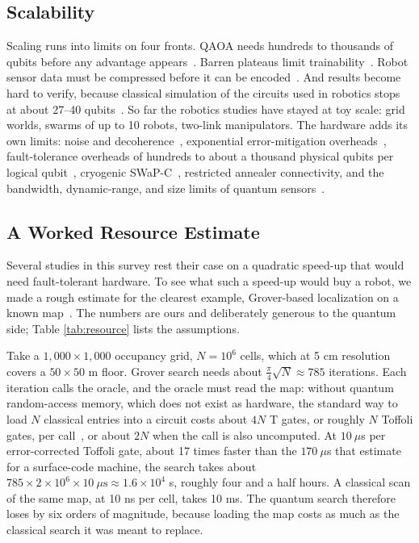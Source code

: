 \documentclass[acmsmall,screen,review]{acmart}
\begin{document}
\subsection{Scalability}\label{sec:scalability}
Scaling runs into limits on four fronts. QAOA needs hundreds to thousands of qubits before any advantage appears~\cite{Guerreschi2019}. Barren plateaus limit trainability~\cite{McClean2018,Larocca2025}. Robot sensor data must be compressed before it can be encoded~\cite{Chen2022}. And results become hard to verify, because classical simulation of the circuits used in robotics stops at about 27--40 qubits~\cite{Chella2022,Antero2025}. So far the robotics studies have stayed at toy scale: grid worlds, swarms of up to 10 robots, two-link manipulators. The hardware adds its own limits: noise and decoherence~\cite{Preskill2018}, exponential error-mitigation overheads~\cite{Cai2023}, fault-tolerance overheads of hundreds to about a thousand physical qubits per logical qubit~\cite{Fowler2012,Bravyi2024}, cryogenic SWaP-C~\cite{Kjaergaard2020}, restricted annealer connectivity, and the bandwidth, dynamic-range, and size limits of quantum sensors~\cite{Bongs2019,Wang2021}.


\subsection{A Worked Resource Estimate}\label{sec:resource}
Several studies in this survey rest their case on a quadratic speed-up that would need fault-tolerant hardware. To see what such a speed-up would buy a robot, we made a rough estimate for the clearest example, Grover-based localization on a known map~\cite{Antero2025}. The numbers are ours and deliberately generous to the quantum side; Table \ref{tab:resource} lists the assumptions.

Take a $1{,}000\times 1{,}000$ occupancy grid, $N=10^6$ cells, which at 5 cm resolution covers a $50\times 50$ m floor. Grover search needs about $\frac{\pi}{4}\sqrt{N}\approx 785$ iterations. Each iteration calls the oracle, and the oracle must read the map: without quantum random-access memory, which does not exist as hardware, the standard way to load $N$ classical entries into a circuit costs about $4N$ T gates, or roughly $N$ Toffoli gates, per call~\cite{Babbush2018}, or about $2N$ when the call is also uncomputed. At $10~\mu$s per error-corrected Toffoli gate, about 17 times faster than the $170~\mu$s that \citet{Babbush2021} estimate for a surface-code machine, the search takes about $785\times 2\times 10^6\times 10~\mu\mathrm{s}\approx 1.6\times 10^4$ s, roughly four and a half hours. A classical scan of the same map, at 10 ns per cell, takes 10 ms. The quantum search therefore loses by six orders of magnitude, because loading the map costs as much as the classical search it was meant to replace.
\end{document}
